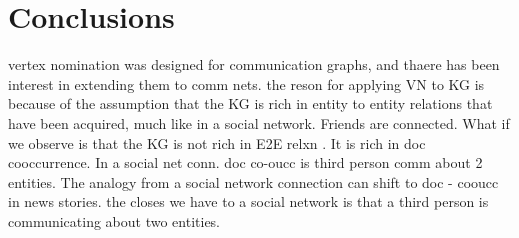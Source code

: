 \documentclass[paper=a4,fontsize=11pt]{scrartcl}
\numberwithin{equation}{section}    %
\numberwithin{figure}{section}      %
\numberwithin{table}{section}       %
\begin{document}

\section{Conclusions}
\label{sec:conclusions}

\begin{snugshade}
  {vertex nomination was designed for communication graphs, and thaere has
been interest in extending them to comm nets. the reson for applying VN to KG is
because of the assumption that the KG is rich in entity to entity relations that
have been acquired, much like in a social network. Friends are connected. What
if we observe is that the KG is not rich in E2E relxn . It is rich in doc
cooccurrence. In a social net conn. doc co-oucc is third person comm about 2
entities. The analogy from a social network connection can shift to doc - cooucc
in news stories. the closes we have to a social network is that a third person
is communicating about two entities.}
\end{snugshade}


\end{document}
